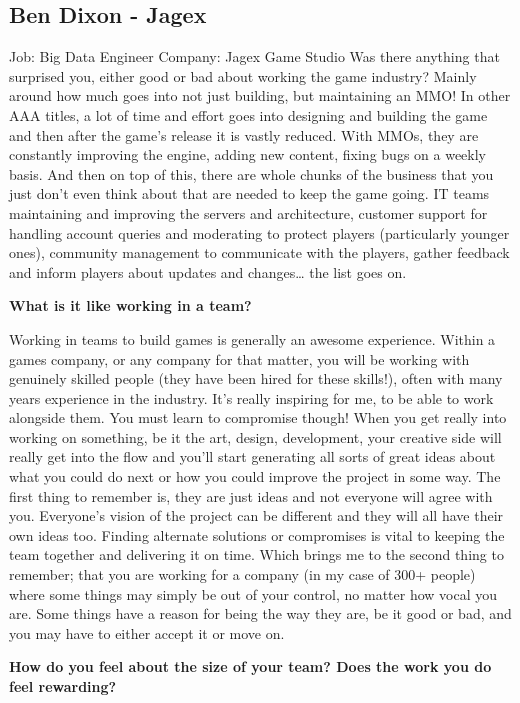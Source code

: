 \documentclass{scrartcl}
\begin{document}
\begin{appendices}
\section{Ben Dixon - Jagex}
Job: Big Data Engineer
Company: Jagex Game Studio
Was there anything that surprised you, either good or bad about working the game industry?
Mainly around how much goes into not just building, but maintaining an MMO! In other AAA titles, a lot of time and effort goes into designing and building the game and then after the game’s release it is vastly reduced. With MMOs, they are constantly improving the engine, adding new content, fixing bugs on a weekly basis.
And then on top of this, there are whole chunks of the business that you just don’t even think about that are needed to keep the game going. IT teams maintaining and improving the servers and architecture, customer support for handling account queries and moderating to protect players (particularly younger ones), community management to communicate with the players, gather feedback and inform players about updates and changes… the list goes on.    
\par
\textbf{What is it like working in a team?}
\par
Working in teams to build games is generally an awesome experience. Within a games company, or any company for that matter, you will be working with genuinely skilled people (they have been hired for these skills!), often with many years experience in the industry. It’s really inspiring for me, to be able to work alongside them.
You must learn to compromise though! When you get really into working on something, be it the art, design, development, your creative side will really get into the flow and you’ll start generating all sorts of great ideas about what you could do next or how you could improve the project in some way. The first thing to remember is, they are just ideas and not everyone will agree with you. Everyone’s vision of the project can be different and they will all have their own ideas too. Finding alternate solutions or compromises is vital to keeping the team together and delivering it on time. Which brings me to the second thing to remember; that you are working for a company (in my case of 300+ people) where some things may simply be out of your control, no matter how vocal you are. Some things have a reason for being the way they are, be it good or bad, and you may have to either accept it or move on.
\par
\textbf{How do you feel about the size of your team? Does the work you do feel rewarding?}

\end{appendices}
\end{document}
